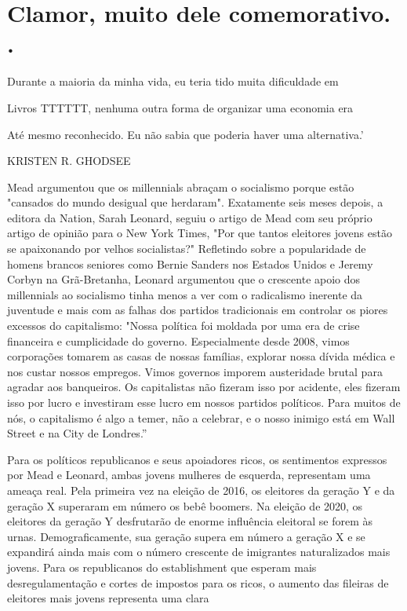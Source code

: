 \section{Clamor, muito dele comemorativo. .}
 \par 
Durante a maioria da minha vida, eu teria tido muita dificuldade em
 \par 
Livros TTTTTT, nenhuma outra forma de organizar uma economia era
 \par 
Até mesmo reconhecido. Eu não sabia que poderia haver uma alternativa.’
 \par 
KRISTEN R. GHODSEE
 \par 
Mead argumentou que os millennials abraçam o socialismo porque estão "cansados ​​do mundo desigual que herdaram". Exatamente seis meses depois, a editora da Nation, Sarah Leonard, seguiu o artigo de Mead com seu próprio artigo de opinião para o New York Times, "Por que tantos eleitores jovens estão se apaixonando por velhos socialistas?" Refletindo sobre a popularidade de homens brancos seniores como Bernie Sanders nos Estados Unidos e Jeremy Corbyn na Grã-Bretanha, Leonard argumentou que o crescente apoio dos millennials ao socialismo tinha menos a ver com o radicalismo inerente da juventude e mais com as falhas dos partidos tradicionais em controlar os piores excessos do capitalismo: "Nossa política foi moldada por uma era de crise financeira e cumplicidade do governo. Especialmente desde 2008, vimos corporações tomarem as casas de nossas famílias, explorar nossa dívida médica e nos custar nossos empregos. Vimos governos imporem austeridade brutal para agradar aos banqueiros. Os capitalistas não fizeram isso por acidente, eles fizeram isso por lucro e investiram esse lucro em nossos partidos políticos. Para muitos de nós, o capitalismo é algo a temer, não a celebrar, e o nosso inimigo está em Wall Street e na City de Londres.”
 \par 
Para os políticos republicanos e seus apoiadores ricos, os sentimentos expressos por Mead e Leonard, ambas jovens mulheres de esquerda, representam uma ameaça real. Pela primeira vez na eleição de 2016, os eleitores da geração Y e da geração X superaram em número os bebê boomers. Na eleição de 2020, os eleitores da geração Y desfrutarão de enorme influência eleitoral se forem às urnas. Demograficamente, sua geração supera em número a geração X e se expandirá ainda mais com o número crescente de imigrantes naturalizados mais jovens. Para os republicanos do establishment que esperam mais desregulamentação e cortes de impostos para os ricos, o aumento das fileiras de eleitores mais jovens representa uma clara
